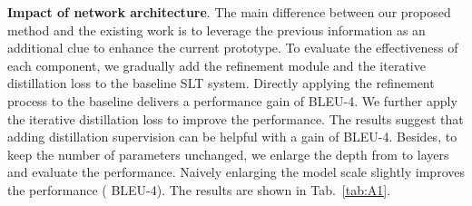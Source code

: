 \documentclass[10pt,twocolumn,letterpaper]{article}
\begin{document}
     \setlength{\tabcolsep}{1pt}
    \begin{table}[!t]
     \scriptsize
     \vspace{0.5mm}
     \caption{
     Generalization of IP-SLT.
     `RM' denotes leveraging the refinement process. 
     `w/' and `w/o' denote the baseline SLT system with and without a refinement process, respectively.
     }
     \label{tab:A3}
     \vspace{-1mm}
     \end{table}

     

     
     
    \smallskip
    \noindent \textbf{Impact of network architecture}.
    The main difference between our proposed method and the existing work is to leverage the previous information as an additional clue to enhance the current prototype. To evaluate the effectiveness of each component, we gradually add the refinement module and the iterative distillation loss to the baseline SLT system. Directly applying the refinement process to the baseline delivers a performance gain of  BLEU-4. 
    We further apply the iterative distillation loss to improve the performance. The results suggest that adding distillation supervision can be helpful with a gain of  BLEU-4. 
    Besides, to keep the number of parameters unchanged, we enlarge the depth from  to  layers and evaluate the performance. 
    Naively enlarging the model scale slightly improves the performance ( BLEU-4).
    The results are shown in Tab.~\ref{tab:A1}. 
\end{document}
